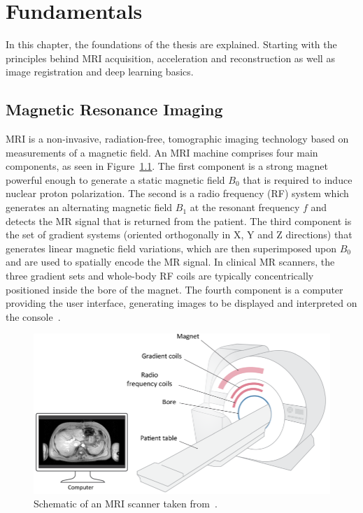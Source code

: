 
\chapter{Fundamentals} \label{Ch:Fundamentals}
In this chapter, the foundations of the thesis are explained. Starting with the principles behind MRI acquisition, acceleration and reconstruction as well as image registration and deep learning basics.

\section{Magnetic Resonance Imaging} \label{Sec:MRI}
MRI is a non-invasive, radiation-free, tomographic imaging technology based on measurements of a magnetic field.  An MRI machine comprises four main components, as seen in Figure~\ref{fig:MRISchematic}. The first component is a strong magnet powerful enough to generate a static magnetic field $B_0$ that is required to induce nuclear proton polarization. The second is a radio frequency (RF) system which generates an alternating magnetic field $B_1$ at the resonant frequency $f$ and detects the MR signal that is returned from the patient. The third component is the set of gradient systems (oriented orthogonally in X, Y and Z directions) that generates linear magnetic field variations, which are then superimposed upon $B_0$ and are used to spatially encode the MR signal. In clinical MR scanners, the three gradient sets and whole-body RF coils are typically concentrically positioned inside the bore of the magnet. The fourth component is a computer providing the user interface, generating images to be displayed and interpreted on the console~\cite{Serai2021}.

\begin{figure}[h] %
 	\centering
 	\includegraphics[width=\linewidth]{./Images/MRI-Schematic.png} 
 	\caption{Schematic of an MRI scanner taken from~\cite{Serai2021}.}
 	\label{fig:MRISchematic}
 \end{figure} 

